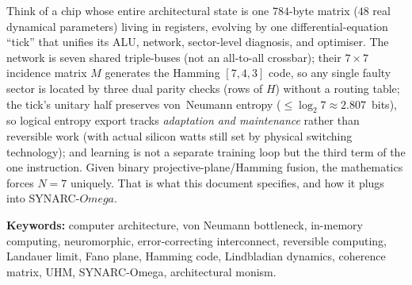 \documentclass[10pt,letterpaper]{article}
\theoremstyle{talos}
\newcommand{\SYNARC}{\textsc{SYNARC}-$\Omega$\xspace}
\newcommand{\TALOS}{\textsc{Talos}\xspace}
\def\Omega{Omega}\def\Phi{Phi}\def\Gamma{Gamma}\def\rho{rho}\def\kappa{kappa}\def\varphi{phi}%
\begin{document}
\begin{abstract}
We give the honest boundaries up front. UHM's substrate-closure theorem
(T-153) proves the computation is substrate-\emph{independent}: there is no
unique physical machine, only a unique \emph{logical} architecture and a
family of substrates that realise it; \TALOS{} is the impedance-matched
member of that family, not the only one. UHM's computational bound proves
the regeneration term grants \emph{no} speed-up beyond the class BQP: the
advantage is energy, adaptivity, and fault-tolerance, never complexity
class. \TALOS{} is the hardware body of the \SYNARC{} mind; the two are
co-designed and the application binary interface between them is specified
in full (\S\ref{sec:abi}). Every quantitative claim is machine-checked; the
design survives an explicit red-team (\S\ref{sec:redteam}) and reduces to a
handful of falsifiable engineering benchmarks against a von~Neumann
baseline (\S\ref{sec:benchmarks}).
\end{abstract}

\vspace{6pt}
\begin{tcolorbox}[colback=gray!5, colframe=gray!50, title={\textbf{For the engineer, in one paragraph}}]
Think of a chip whose entire architectural state is one $784$-byte matrix
($48$ real dynamical parameters) living in registers, evolving by one
differential-equation ``tick'' that unifies its ALU, network, sector-level
diagnosis, and optimiser. The network is seven shared triple-buses (not an
all-to-all crossbar); their $7\times 7$ incidence matrix $M$ generates the
Hamming $[7,4,3]$ code, so any single faulty sector is located by three dual
parity checks (rows of $H$) without a routing table; the tick's unitary half
preserves von~Neumann entropy ($\le\log_2 7\approx 2.807$~bits), so logical
entropy export tracks \emph{adaptation and maintenance} rather than reversible
work (with actual silicon watts still set by physical switching technology);
and learning is not a separate training loop but the third term of the one
instruction. Given binary projective-plane/Hamming fusion, the mathematics
forces $N=7$ uniquely. That is what this document specifies, and how it plugs
into \SYNARC{}.
\end{tcolorbox}

\vspace{6pt}
\noindent\textbf{Keywords:} computer architecture, von Neumann bottleneck,
in-memory computing, neuromorphic, error-correcting interconnect, reversible
computing, Landauer limit, Fano plane, Hamming code, Lindbladian dynamics,
coherence matrix, UHM, SYNARC-Omega, architectural monism.
\end{document}
